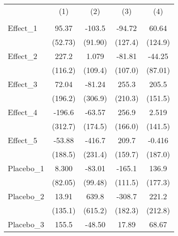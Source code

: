 {
\def\sym#1{\ifmmode^{#1}\else\(^{#1}\)\fi}
\begin{tabular}{l*{4}{c}}
\toprule
            &\multicolumn{1}{c}{(1)}&\multicolumn{1}{c}{(2)}&\multicolumn{1}{c}{(3)}&\multicolumn{1}{c}{(4)}\\
            &\multicolumn{1}{c}{} &\multicolumn{1}{c}{} &\multicolumn{1}{c}{} &\multicolumn{1}{c}{} \\
\midrule
Effect\_1    &       95.37         &      -103.5         &      -94.72         &       60.64         \\
            &     (52.73)         &     (91.90)         &     (127.4)         &     (124.9)         \\
\addlinespace
Effect\_2    &       227.2         &       1.079         &      -81.81         &      -44.25         \\
            &     (116.2)         &     (109.4)         &     (107.0)         &     (87.01)         \\
\addlinespace
Effect\_3    &       72.04         &      -81.24         &       255.3         &       205.5         \\
            &     (196.2)         &     (306.9)         &     (210.3)         &     (151.5)         \\
\addlinespace
Effect\_4    &      -196.6         &      -63.57         &       256.9         &       2.519         \\
            &     (312.7)         &     (174.5)         &     (166.0)         &     (141.5)         \\
\addlinespace
Effect\_5    &      -53.88         &      -416.7         &       209.7         &      -0.416         \\
            &     (188.5)         &     (231.4)         &     (159.7)         &     (187.0)         \\
\addlinespace
Placebo\_1   &       8.300         &      -83.01         &      -165.1         &       136.9         \\
            &     (82.05)         &     (99.48)         &     (111.5)         &     (177.3)         \\
\addlinespace
Placebo\_2   &       13.91         &       639.8         &      -308.7         &       221.2         \\
            &     (135.1)         &     (615.2)         &     (182.3)         &     (212.8)         \\
\addlinespace
Placebo\_3   &       155.5         &      -48.50         &       17.89         &       68.67         \\

\end{tabular}}
